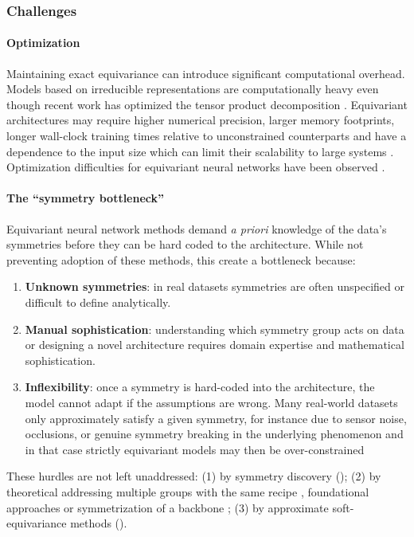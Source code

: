 \subsubsection{Challenges}

\paragraph{Optimization}
Maintaining exact equivariance can introduce significant computational overhead.
Models based on irreducible representations are computationally heavy even though recent work has optimized the tensor product decomposition \citep{passaro2023,luo2024a}.
Equivariant architectures may require higher numerical precision, larger memory footprints, longer wall-clock training times relative to unconstrained counterparts and have a dependence to the input size which can limit their scalability to large systems \citep{bogatskiy2020p3icml}.
Optimization difficulties for equivariant neural networks have been observed \citep{pertigkiozoglou2024}.

\paragraph{The ``symmetry bottleneck''}\label{par:sym-bottleneck}
Equivariant neural network methods demand \textit{a priori} knowledge of the data's symmetries before they can be hard coded to the architecture.
While not preventing adoption of these methods, this create a bottleneck because:
\begin{enumerate}
    \item \textbf{Unknown symmetries}: in real datasets symmetries are often unspecified or difficult to define analytically.
    \item \textbf{Manual sophistication}: understanding which symmetry group acts on data or designing a novel architecture requires domain expertise and mathematical sophistication.
    \item \textbf{Inflexibility}: once a symmetry is hard-coded into the architecture, the model cannot adapt if the assumptions are wrong.
    Many real-world datasets only approximately satisfy a given symmetry, for instance due to sensor noise, occlusions, or genuine symmetry breaking in the underlying phenomenon and in that case strictly equivariant models may then be over-constrained
\end{enumerate}
These hurdles are not left unaddressed: (1) by symmetry discovery (); (2) by theoretical addressing multiple groups with the same recipe \citep{ravanbakhsh2017p3icml,finzi2020p3icml,finzi2021p3icml,pearce-crump2023p4icml}, foundational approaches \citep{goel2025} or symmetrization of a backbone \citep{puny2021,kaba2023p4icml}; (3) by approximate soft-equivariance methods ().

